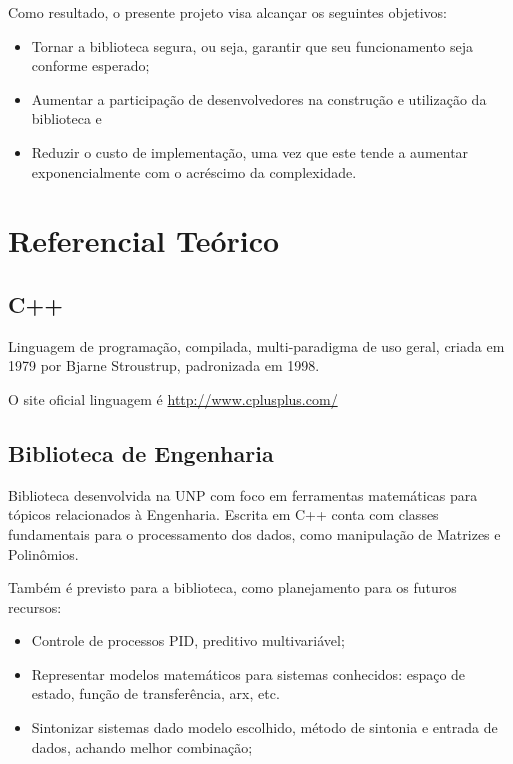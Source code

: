\documentclass[
	article,			%
	12pt,				%
	oneside,			%
	a4paper,			%
	english,			
	brazil,
	sumario=tradicional
	]{abntex2}
\begin{document}
Como resultado, o presente projeto visa alcançar os seguintes objetivos:
\begin{itemize}
	\item{Tornar a biblioteca segura, ou seja, garantir que seu funcionamento seja conforme esperado;}
	\item{Aumentar a participação de desenvolvedores na construção e utilização da biblioteca e}
	\item{Reduzir o custo de implementação, uma vez que este tende a aumentar exponencialmente com o acréscimo da complexidade.}
\end{itemize}

\pagebreak
\section{Referencial Teórico}


\subsection{C++}

Linguagem de programação, compilada, multi-paradigma de uso geral, criada em 1979 por Bjarne Stroustrup, padronizada em 1998.

O site oficial linguagem é \href{http://www.cplusplus.com/}{http://www.cplusplus.com/}


\subsection{Biblioteca de Engenharia}

Biblioteca desenvolvida na UNP com foco em ferramentas matemáticas para tópicos relacionados à Engenharia. Escrita em C++ conta com classes fundamentais para o processamento dos dados, como manipulação de Matrizes e Polinômios. 

Também é previsto para a biblioteca, como planejamento para os futuros recursos:

\begin{itemize}
	\item{Controle de processos PID, preditivo multivariável;}
	\item Representar modelos matemáticos para sistemas conhecidos: espaço de estado, função de transferência, arx, etc.
	\item Sintonizar sistemas dado modelo escolhido, método de sintonia e entrada de dados, achando melhor combinação;
\end{itemize}
\end{document}
